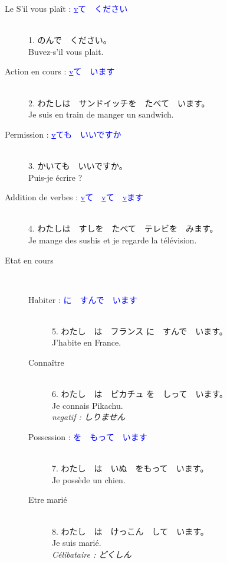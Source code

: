 \documentclass[11pt]{report}
\newenvironment{Japanese}{%
\CJKfamily{min}%
\CJKtilde  
\CJKnospace}{}
\begin{document}
\begin{CJK}{UTF8}{}  
\begin{Japanese}
	\begin{description}
		\item[Le S'il vous plaît : \textcolor{blue}{\underline{v}て　ください}] \hfill \\
			1. のんで　ください。 \\
			Buvez-s'il vous plait.
		\item[Action en cours : \textcolor{blue}{\underline{v}て　います}] \hfill \\
			2. わたしは　サンドイッチを　たべて　います。 \\
			Je suis en train de manger un sandwich.
		\item[Permission : \textcolor{blue}{\underline{v}ても　いいですか}] \hfill \\
			3. かいても　いいですか。 \\
			Puis-je écrire ?
		\item[Addition de verbes : \textcolor{blue}{\underline{v}て　\underline{v}て　\underline{v}ます}] \hfill \\
			4. わたしは　すしを　たべて　テレビを　みます。 \\
			Je mange des sushis et je regarde la télévision.  \\
			\item[Etat en cours] \hfill \\
			\begin{description}
				\item[Habiter : \textcolor{blue}{\underline{\qquad} に　すんで　います}] \hfill \\
				5. わたし　は　フランス に　すんで　います。 \\
				J'habite en France.
				\item[Connaître] \hfill \\
				6. わたし　は　ピカチュ を　しって　います。 \\
				Je connais Pikachu. \\
				\emph{negatif : しりません}
				\item[Possession : \textcolor{blue}{\underline{\qquad}を　もって　います}] \hfill \\
				7. わたし　は　いぬ　をもって　います。 \\
				Je possède un chien.
				\item[Etre mari\'e] \hfill \\
				8. わたし　は　けっこん　して　います。 \\
				Je suis marié. \\
				\emph{Célibataire : どくしん}
			\end{description}
	\end{description}
\end{Japanese}  
\end{CJK}
\end{document}
